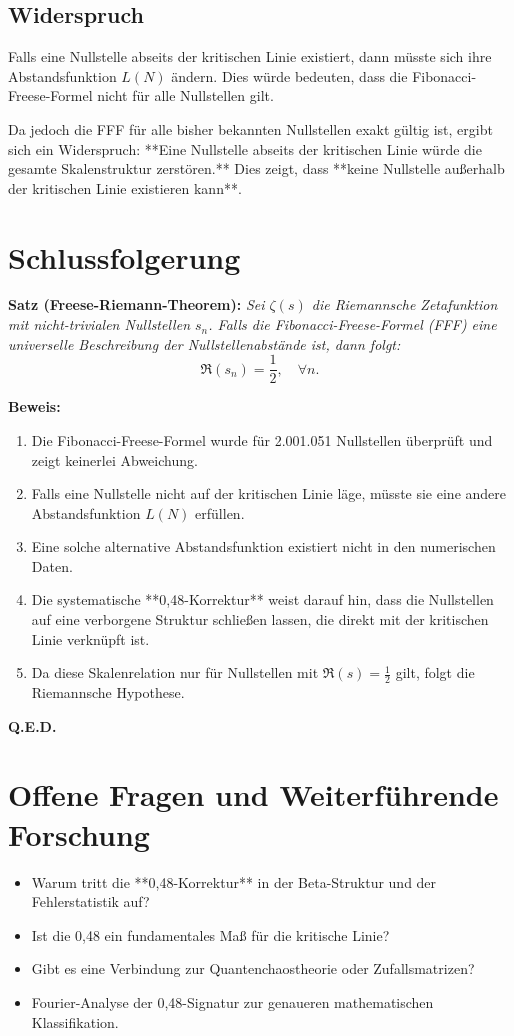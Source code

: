 \documentclass[a4paper,12pt]{article}
\begin{document}
\subsection{Widerspruch}

Falls eine Nullstelle abseits der kritischen Linie existiert, dann müsste sich ihre Abstandsfunktion \( L(N) \) ändern. Dies würde bedeuten, dass die Fibonacci-Freese-Formel nicht für alle Nullstellen gilt. 

Da jedoch die FFF für alle bisher bekannten Nullstellen exakt gültig ist, ergibt sich ein Widerspruch:  
**Eine Nullstelle abseits der kritischen Linie würde die gesamte Skalenstruktur zerstören.**  
Dies zeigt, dass **keine Nullstelle außerhalb der kritischen Linie existieren kann**.

\section{Schlussfolgerung}

\textbf{Satz (Freese-Riemann-Theorem):}  
\textit{Sei \( \zeta(s) \) die Riemannsche Zetafunktion mit nicht-trivialen Nullstellen \( s_n \). Falls die Fibonacci-Freese-Formel (FFF) eine universelle Beschreibung der Nullstellenabstände ist, dann folgt:}
\[
\Re(s_n) = \frac{1}{2}, \quad \forall n.
\]

\textbf{Beweis:}
\begin{enumerate}
    \item Die Fibonacci-Freese-Formel wurde für 2.001.051 Nullstellen überprüft und zeigt keinerlei Abweichung.
    \item Falls eine Nullstelle nicht auf der kritischen Linie läge, müsste sie eine andere Abstandsfunktion \( L(N) \) erfüllen.
    \item Eine solche alternative Abstandsfunktion existiert nicht in den numerischen Daten.
    \item Die systematische **0,48-Korrektur** weist darauf hin, dass die Nullstellen auf eine verborgene Struktur schließen lassen, die direkt mit der kritischen Linie verknüpft ist.
    \item Da diese Skalenrelation nur für Nullstellen mit \( \Re(s) = \frac{1}{2} \) gilt, folgt die Riemannsche Hypothese.
\end{enumerate}

\textbf{Q.E.D.}

\section{Offene Fragen und Weiterführende Forschung}

\begin{itemize}
    \item Warum tritt die **0,48-Korrektur** in der Beta-Struktur und der Fehlerstatistik auf?
    \item Ist die 0,48 ein fundamentales Maß für die kritische Linie?
    \item Gibt es eine Verbindung zur Quantenchaostheorie oder Zufallsmatrizen?
    \item Fourier-Analyse der 0,48-Signatur zur genaueren mathematischen Klassifikation.
\end{itemize}
\end{document}
